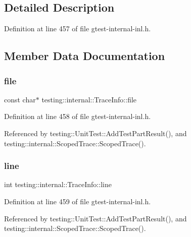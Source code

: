 \subsection{Detailed Description}


Definition at line 457 of file gtest-\/internal-\/inl.\+h.



\subsection{Member Data Documentation}
\mbox{\label{structtesting_1_1internal_1_1TraceInfo_a5d801209d3c0840aa55cfd4b67504254}} 
\subsubsection{\texorpdfstring{file}{file}}
{\footnotesize\ttfamily const char$\ast$ testing\+::internal\+::\+Trace\+Info\+::file}



Definition at line 458 of file gtest-\/internal-\/inl.\+h.



Referenced by testing\+::\+Unit\+Test\+::\+Add\+Test\+Part\+Result(), and testing\+::internal\+::\+Scoped\+Trace\+::\+Scoped\+Trace().

\mbox{\label{structtesting_1_1internal_1_1TraceInfo_ae9d269de1b77f4a3180d0d34acb4d7ff}} 
\subsubsection{\texorpdfstring{line}{line}}
{\footnotesize\ttfamily int testing\+::internal\+::\+Trace\+Info\+::line}



Definition at line 459 of file gtest-\/internal-\/inl.\+h.



Referenced by testing\+::\+Unit\+Test\+::\+Add\+Test\+Part\+Result(), and testing\+::internal\+::\+Scoped\+Trace\+::\+Scoped\+Trace().


